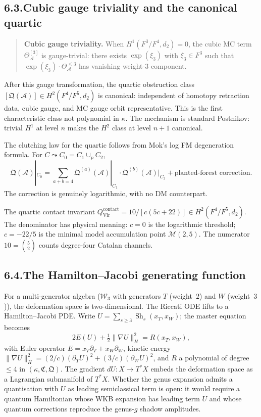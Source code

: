 \documentclass[11pt]{report}
\theoremstyle{definition}
\theoremstyle{remark}
\providecommand{\cA}{\mathcal{A}}
\numberwithin{equation}{section}
\begin{document}
\subsection*{6.3.\enspace Cubic gauge triviality and the canonical quartic}

\begin{quote}
\textbf{Cubic gauge triviality.}\enspace
When $H^1(F^3/F^4,d_2)=0$, the cubic MC term $\Theta^{[3]}_\cA$ is
gauge-trivial: there exists $\exp(\xi_3)$ with $\xi_3\in F^3$ such that
$\exp(\xi_3)\cdot\Theta^{\le 3}_\cA$ has vanishing weight-$3$
component.
\end{quote}

After this gauge transformation, the quartic obstruction class
$[\mathfrak Q(\cA)]\in H^2(F^4/F^5,d_2)$ is canonical: independent of
homotopy retraction data, cubic gauge, and MC gauge orbit
representative. This is the first characteristic class not polynomial
in $\kappa$. The mechanism is standard Postnikov: trivial $H^1$ at
level $n$ makes the $H^2$ class at level $n+1$ canonical.

The clutching law for the quartic follows from Mok's log FM
degeneration formula. For $C\leadsto C_0=C_1\cup_p C_2$,
\[
\mathfrak Q(\cA)|_{C_0}=\sum_{a+b=4}\mathfrak Q^{(a)}(\cA)|_{C_1}\cdot\mathfrak Q^{(b)}(\cA)|_{C_2}+\text{planted-forest correction}.
\]
The correction is genuinely logarithmic, with no DM counterpart.

The quartic contact invariant
$Q^{\mathrm{contact}}_{\mathrm{Vir}}=10/[c(5c+22)]\in H^2(F^4/F^5,d_2)$.
The denominator has physical meaning: $c=0$ is the logarithmic
threshold; $c=-22/5$ is the minimal model accumulation point
$\mathcal M(2,5)$. The numerator $10=\binom{5}{2}$ counts degree-four
Catalan channels.

\subsection*{6.4.\enspace The Hamilton--Jacobi generating function}

For a multi-generator algebra ($\mathcal W_3$ with generators $T$
(weight~$2$) and $W$ (weight~$3$)), the deformation space is
two-dimensional. The Riccati ODE lifts to a Hamilton--Jacobi PDE.
Write $U=\sum_{s\ge 3}\operatorname{Sh}_s(x_T,x_W)$; the master equation
becomes
\[
2E(U)+\tfrac12\lVert\nabla U\rVert^2_H=R(x_T,x_W),
\]
with Euler operator $E=x_T\partial_T+x_W\partial_W$, kinetic energy
$\lVert\nabla U\rVert^2_H=(2/c)(\partial_T U)^2+(3/c)(\partial_W U)^2$,
and $R$ a polynomial of degree $\le 4$ in
$(\kappa,\mathfrak C,\mathfrak Q)$. The gradient $dU\colon X\to T^*X$
embeds the deformation space as a Lagrangian submanifold of $T^*X$.
Whether the genus expansion admits a quantisation with $U$ as leading
semiclassical term is open: it would require a quantum Hamiltonian
whose WKB expansion has leading term $U$ and whose quantum corrections
reproduce the genus-$g$ shadow amplitudes.
\end{document}
